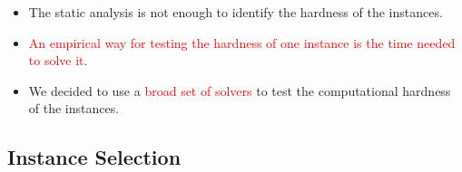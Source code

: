 \begin{itemize}
\item The static analysis is not enough to identify the hardness of the instances.
\item \textcolor{red}{An empirical way for testing the hardness of one instance is the time needed to solve it}.
\item We decided to use a \textcolor{red}{broad set of solvers} to test the computational hardness of the instances.
\end{itemize}




\subsection{Instance Selection}\label{subsec:selection}










